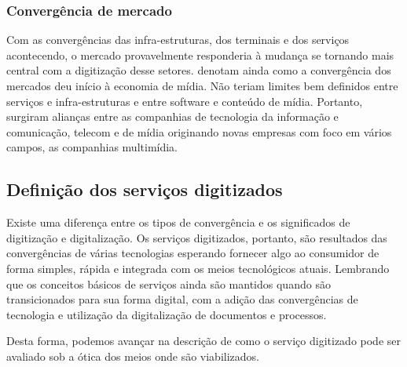 \subsubsection{Convergência de mercado}

Com as convergências das infra-estruturas, dos terminais e dos serviços acontecendo, o mercado provavelmente responderia à mudança se tornando mais central com a digitização desse setores. \cite{storsul2010} denotam ainda como a convergência dos mercados deu início à economia de mídia. Não teriam limites bem definidos entre serviços e infra-estruturas e entre software e conteúdo de mídia. Portanto, surgiram alianças entre as companhias de tecnologia da informação e comunicação, telecom e de mídia originando novas empresas com foco em vários campos, as companhias multimídia.

\subsection{Definição dos serviços digitizados}

Existe uma diferença entre os tipos de convergência e os significados de digitização e digitalização. Os serviços digitizados, portanto, são resultados das convergências de várias tecnologias esperando fornecer algo ao consumidor de forma simples, rápida e integrada com os meios tecnológicos atuais. Lembrando que os conceitos básicos de serviços ainda são mantidos quando são transicionados para sua forma digital, com a adição das convergências de tecnologia e utilização da digitalização de documentos e processos. 

Desta forma, podemos avançar na descrição de como o serviço digitizado pode ser avaliado sob a ótica dos meios onde são viabilizados.

